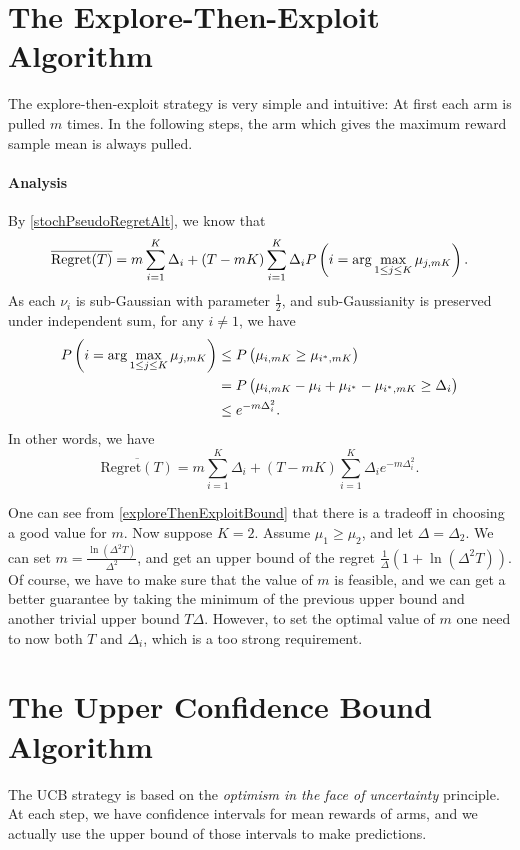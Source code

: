 \documentclass[openany]{book}
\theoremstyle{definition}
\theoremstyle{remark}
\begin{document}
\section{The Explore-Then-Exploit Algorithm}
The explore-then-exploit strategy is very simple and intuitive: At first each arm is pulled $m$ times. In the following steps, the arm which gives the maximum reward sample mean is always pulled.

\paragraph{Analysis}
By \eqref{stochPseudoRegretAlt}, we know that
\begin{equation*}
    \overline{\mathrm{Regret}(T)}=m \sum_{i=1}^{K}\Delta_i+(T-mK)\sum_{i=1}^{K}\Delta_iP\del{i=\arg\max_{1\le j\le K}\mu_{j,mK}}.
\end{equation*}
As each $\nu_i$ is sub-Gaussian with parameter $\frac{1}{2}$, and sub-Gaussianity is preserved under independent sum, for any $i\ne1$, we have
\begin{align*}
    P\del{i=\arg\max_{1\le j\le K}\mu_{j,mK}} & \le P\del{\mu_{i,mK}\ge\mu_{i^*,mK}} \\
     & =P\del{\mu_{i,mK}-\mu_i+\mu_{i^*}-\mu_{i^*,mK}\ge\Delta_i} \\
     & \le e^{-m\Delta_i^2}.
\end{align*}
In other words, we have
\begin{equation}\label{exploreThenExploitBound}
    \overline{\mathrm{Regret}(T)}=m \sum_{i=1}^{K}\Delta_i+(T-mK)\sum_{i=1}^{K}\Delta_ie^{-m\Delta_i^2}.
\end{equation}

One can see from \eqref{exploreThenExploitBound} that there is a tradeoff in choosing a good value for $m$. Now suppose $K=2$. Assume $\mu_1\ge\mu_2$, and let $\Delta=\Delta_2$. We can set $m=\frac{\ln(\Delta^2T)}{\Delta^2}$, and get an upper bound of the regret $\frac{1}{\Delta}(1+\ln(\Delta^2T))$. Of course, we have to make sure that the value of $m$ is feasible, and we can get a better guarantee by taking the minimum of the previous upper bound and another trivial upper bound $T\Delta$. However, to set the optimal value of $m$ one need to now both $T$ and $\Delta_i$, which is a too strong requirement.

\section{The Upper Confidence Bound Algorithm}
The UCB strategy is based on the \emph{optimism in the face of uncertainty} principle. At each step, we have confidence intervals for mean rewards of arms, and we actually use the upper bound of those intervals to make predictions.
\end{document}
